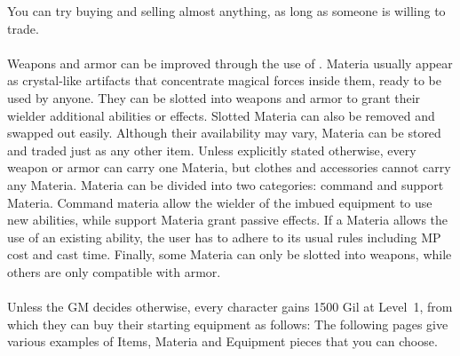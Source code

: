 You can try buying and selling almost anything, as long as someone is willing to trade.
%
\vfill
%
%
\newpage
%
\\\\
%
Weapons and armor can be improved through the use of .
Materia usually appear as crystal-like artifacts that concentrate magical forces inside them, ready to be used by anyone.
They can be slotted into weapons and armor to grant their wielder additional abilities or effects.
Slotted Materia can also be removed and swapped out easily. 
Although their availability may vary, Materia can be stored and traded just as any other item.
Unless explicitly stated otherwise, every weapon or armor can carry one Materia, but clothes and accessories cannot carry any Materia.
Materia can be divided into two categories: command and support Materia.
Command materia allow the wielder of the imbued equipment to use new abilities, while support Materia grant passive effects.
If a Materia allows the use of an existing ability, the user has to adhere to its usual rules including MP cost and cast time.
Finally, some Materia can only be slotted into weapons, while others are only compatible with armor.
%
\vfill
%
\\\\
%
Unless the GM decides otherwise, every character gains 1500 Gil at Level~1, from which they can buy their starting equipment as follows:
\ofrow
{}
The following pages give various examples of Items, Materia and Equipment pieces that you can choose.
